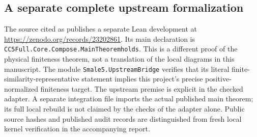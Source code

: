 \documentclass[Threeside,11pt]{article}
\theoremstyle{definition}
\theoremstyle{remark}
\numberwithin{equation}{section}
\theoremstyle{remark}
\newcommand{\code}[1]{\begingroup\def\_{\textunderscore\allowbreak}\texttt{#1}\endgroup}
\begin{document}
\subsection{A separate complete upstream formalization}
The source cited as \cite{FiveT} publishes a separate Lean development at
\url{https://zenodo.org/records/23202861}. Its main declaration is
\code{CC5Full.Core.Compose.MainTheorem\_holds}. This is a different proof
of the physical finiteness theorem, not a translation of the local diagrams
in this manuscript. The module \code{Smale5.UpstreamBridge} verifies that
its literal finite-similarity-representative statement implies this project's
precise positive-normalized finiteness target. The upstream premise is explicit
in the checked adapter. A separate integration file imports the actual
published main theorem; its full local rebuild is not claimed by the checks
of the adapter alone. Public source hashes and published audit records are
distinguished from fresh local kernel verification in the accompanying report.
\end{document}
